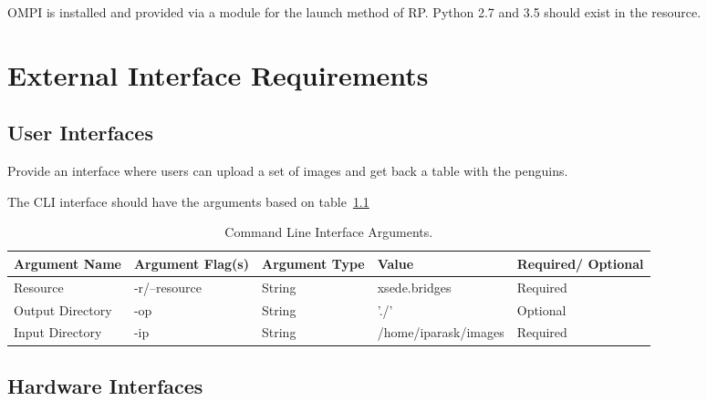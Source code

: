 \documentclass{scrreprt}
\begin{document}
OMPI is installed and provided via a module for the launch method of RP. Python 2.7 
and 3.5 should exist in the resource.


\chapter{External Interface Requirements}

\section{User Interfaces}
\iffalse
$<$Describe the logical characteristics of each interface between the software 
product and the users. This may include sample screen images, any GUI standards 
or product family style guides that are to be followed, screen layout 
constraints, standard buttons and functions (e.g., help) that will appear on 
every screen, keyboard shortcuts, error message display standards, and so on.  
Define the software components for which a user interface is needed. Details of 
the user interface design should be documented in a separate user interface 
specification.$>$
\fi

Provide an interface where users can upload a set of images and get back a table 
with the penguins.

The CLI interface should have the arguments based on table~\ref{tab:cli_interface}

\begin{table}[ht]
	\centering
	\begin{tabular}{|p{2.5cm}|p{2.2cm}|p{1.8cm}|p{4cm}|p{2cm}|}
		\hline
		Argument Name    & Argument Flag(s) & Argument Type & Value & Required/ Optional\\\hline
		Resource         & -r/--resource    & String        & xsede.bridges & Required\\\hline
		Output Directory & -op              & String        & './'    & Optional\\\hline
		Input Directory  & -ip              & String        & /home/iparask/images & Required\\
		\hline
	\end{tabular}
	\caption{Command Line Interface Arguments.\label{tab:cli_interface}}
\end{table}


\section{Hardware Interfaces}
\iffalse
$<$Describe the logical and physical characteristics of each interface between 
the software product and the hardware components of the system. This may include 
the supported device types, the nature of the data and control interactions 
between the software and the hardware, and communication protocols to be 
used.$>$
\fi
\end{document}
